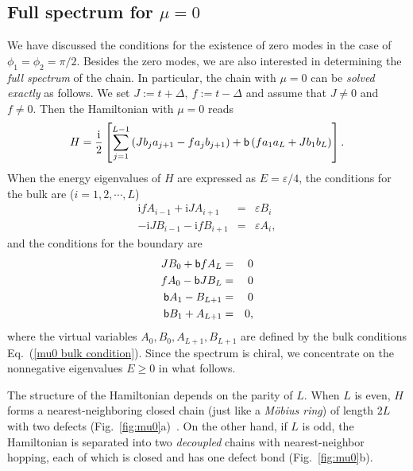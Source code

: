 \documentclass[aps, prb, showpacs, twocolumn, %
amssymb,superscriptaddress]{revtex4}
\newcommand{\ii}{\text{i}}
\begin{document}
\subsection{Full spectrum for $\mu=0$}
\label{sec:full spectrum mu0}
We have discussed the conditions for the existence of zero modes in the case of $\phi_{1} = \phi_{2} = \pi/2$. Besides the zero modes, we are also interested in determining the \textit{full spectrum} of the chain. In particular, the chain with $\mu = 0$ can be \textit{solved exactly} as follows.
We set $J := t+\Delta,~f := t-\Delta$ and assume that $J \neq 0$ and $f \neq 0$. 
Then the Hamiltonian with $\mu=0$ reads
\begin{equation}
H = \frac{\ii}{2} \left[ \sum_{j=1}^{L-1} \left( J b_{j} a_{j+1} - f a_{j} b_{j+1} \right) + {\sf b} \left( f a_{1} a_{L} + J b_{1} b_{L} \right) \right].
\end{equation}
When the energy eigenvalues of $H$ are expressed as $E = \varepsilon /4$, the conditions for the bulk are ($i=1,2, \cdots, L$)
\begin{eqnarray}
\ii fA_{i-1} + \ii JA_{i+1} &=& \varepsilon B_{i} \nonumber \\
- \ii JB_{i-1} - \ii fB_{i+1} &=& \varepsilon A_{i},
	\label{mu0 bulk condition}
\end{eqnarray}
and the conditions for the boundary are
\begin{eqnarray}
JB_{0} + {\sf b} f A_{L} &=& 0 \nonumber \\
fA_{0} - {\sf b} J B_{L} &=& 0 \nonumber \\
{\sf b} A_{1} - B_{L+1} &=& 0 \nonumber \\
{\sf b} B_{1} + A_{L+1} &=& 0,
	\label{mu0 boundary conditions}
\end{eqnarray}
where the virtual variables $A_{0}, B_{0}, A_{L+1}, B_{L+1}$ are defined by the bulk conditions Eq.~(\ref{mu0 bulk condition}). Since the spectrum is chiral, we concentrate on the nonnegative eigenvalues $E\geq 0$ in what follows.


The structure of the Hamiltonian depends on the parity of $L$. When $L$ is even, $H$ forms a nearest-neighboring closed chain (just like a \textit{M\"obius ring}) of length $2L$ with two defects (Fig.~\ref{fig:mu0}a)~\cite{PLA}. On the other hand, if $L$ is odd, the Hamiltonian is separated into two \textit{decoupled} chains with nearest-neighbor hopping, each of which is closed and has one defect bond (Fig.~\ref{fig:mu0}b). 
\end{document}
